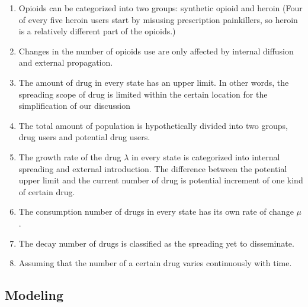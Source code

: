 \documentclass[12pt]{article}
\begin{document}
\begin{enumerate}[\bfseries 1.]
    \item Opioids can be categorized into two groups: synthetic opioid and heroin (Four of every five heroin users start by misusing prescription painkillers, so heroin is a relatively different part of the opioids.)

    \item Changes in the number of opioids use are only affected by internal diffusion and external propagation.

    \item The amount of drug in every state has an upper limit. In other words, the spreading scope of drug is limited within the certain location for the simplification of our discussion

    \item The total amount of population is hypothetically divided into two groups, drug users and potential drug users.
    
    \item The growth rate of the drug $\lambda$ in every state is categorized into internal spreading and external introduction. The difference between the potential upper limit and the current number of drug is potential increment of one kind of certain drug.
    
    \item The consumption number of drugs in every state has its own rate of change $\mu$.
    
    \item The decay number of drugs is classified as the spreading yet to disseminate.
    
    \item Assuming that the number of a certain drug varies continuously with time.
\end{enumerate}

\subsection{Modeling}
\end{document}
